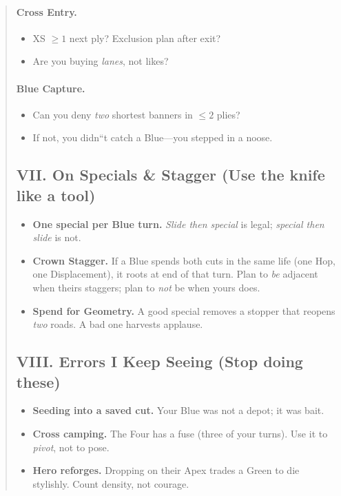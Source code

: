 \documentclass[11pt]{article}
\begin{document}
\begin{quote}
\paragraph{Cross Entry.}
\begin{itemize}\itemsep0.15em
  \item XS $\ge 1$ next ply? Exclusion plan after exit?
  \item Are you buying \emph{lanes}, not likes?
\end{itemize}
\paragraph{Blue Capture.}
\begin{itemize}\itemsep0.15em
  \item Can you deny \emph{two} shortest banners in $\le 2$ plies?
  \item If not, you didn``t catch a Blue---you stepped in a noose.
\end{itemize}

\subsection{VII. On Specials \& Stagger (Use the knife like a tool)}
\begin{itemize}\itemsep0.2em
  \item \textbf{One special per Blue turn.} \emph{Slide then special} is legal; \emph{special then slide} is not.
  \item \textbf{Crown Stagger.} If a Blue spends both cuts in the same life (one Hop, one Displacement), it roots at end of that turn. Plan to \emph{be} adjacent when theirs staggers; plan to \emph{not} be when yours does.
  \item \textbf{Spend for Geometry.} A good special removes a stopper that reopens \emph{two} roads. A bad one harvests applause.
\end{itemize}

\subsection{VIII. Errors I Keep Seeing (Stop doing these)}
\begin{itemize}\itemsep0.2em
  \item \textbf{Seeding into a saved cut.} Your Blue was not a depot; it was bait.
  \item \textbf{Cross camping.} The Four has a fuse (three of your turns). Use it to \emph{pivot}, not to pose.
  \item \textbf{Hero reforges.} Dropping on their Apex trades a Green to die stylishly. Count density, not courage.
\end{itemize}


\end{quote}
\end{document}
